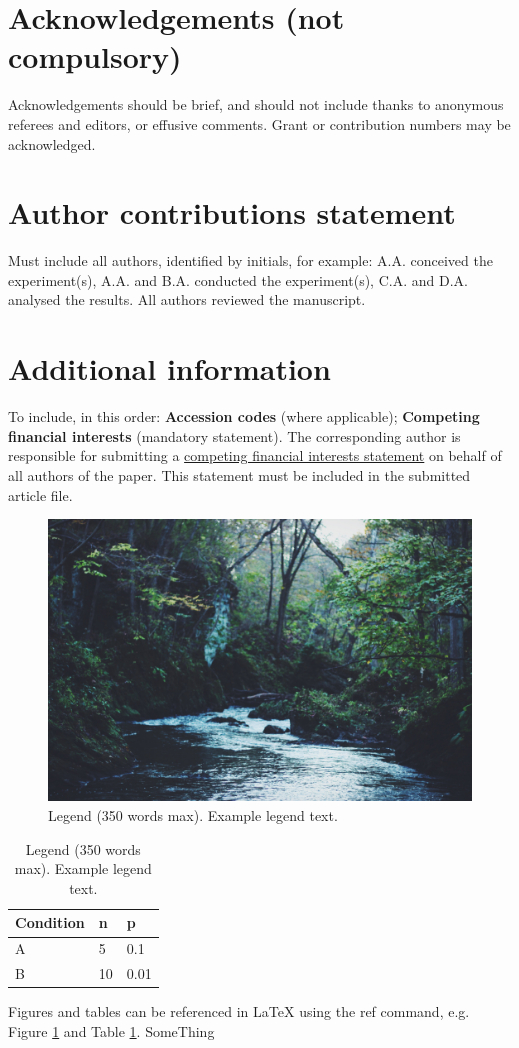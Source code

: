 \documentclass[fleqn,10pt]{wlscirep}%
\begin{document}
\section*{Acknowledgements (not compulsory)}%
%
Acknowledgements should be brief, and should not include thanks to anonymous referees and editors, or effusive comments. Grant or contribution numbers may be acknowledged.%
%
\section*{Author contributions statement}%
%
Must include all authors, identified by initials, for example:%
A.A. conceived the experiment(s),  A.A. and B.A. conducted the experiment(s), C.A. and D.A. analysed the results.  All authors reviewed the manuscript. %
%
\section*{Additional information}%
%
To include, in this order: \textbf{Accession codes} (where applicable); \textbf{Competing financial interests} (mandatory statement). %
%
The corresponding author is responsible for submitting a \href{http://www.nature.com/srep/policies/index.html#competing}{competing financial interests statement} on behalf of all authors of the paper. This statement must be included in the submitted article file.%
%
\begin{figure}[ht]%
\centering%
\includegraphics[width=\linewidth]{stream}%
\caption{Legend (350 words max). Example legend text.}%
\label{fig:stream}%
\end{figure}%
%
\begin{table}[ht]%
\centering%
\begin{tabular}{|l|l|l|}%
\hline%
Condition & n & p \\%
\hline%
A & 5 & 0.1 \\%
\hline%
B & 10 & 0.01 \\%
\hline%
\end{tabular}%
\caption{\label{tab:example}Legend (350 words max). Example legend text.}%
\end{table}%
%
Figures and tables can be referenced in LaTeX using the ref command, e.g. Figure \ref{fig:stream} and Table \ref{tab:example}.%
%
SomeThing%
\end{document}
